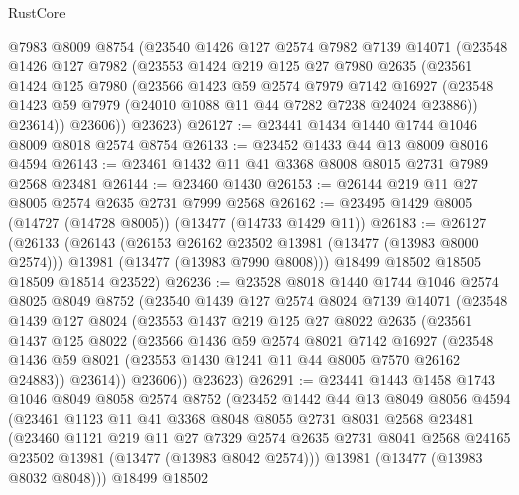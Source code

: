 \begin{lexlean}{RustCore}
\begin{coremodule}
    @7983
    @8009
    @8754
    (@23540
      @1426
      @127
      @2574
      @7982
      @7139
      @14071
      (@23548
        @1426
        @127
        @7982
        (@23553
          @1424
          @219
          @125
          @27
          @7980
          @2635
          (@23561
            @1424
            @125
            @7980
            (@23566
              @1423
              @59
              @2574
              @7979
              @7142
              @16927
              (@23548 @1423 @59 @7979 (@24010 @1088 @11 @44 @7282 @7238 @24024 @23886))
              @23614))
          @23606))
      @23623)
@26127 := @23441 @1434 @1440 @1744 @1046 @8009 @8018 @2574 @8754
@26133 := @23452 @1433 @44 @13 @8009 @8016 @4594
@26143 := @23461 @1432 @11 @41 @3368 @8008 @8015 @2731 @7989 @2568 @23481
@26144 := @23460 @1430
@26153 := @26144 @219 @11 @27 @8005 @2574 @2635 @2731 @7999 @2568
@26162 := @23495 @1429 @8005 (@14727 (@14728 @8005)) (@13477 (@14733 @1429 @11))
@26183 := @26127
    (@26133
      (@26143
        (@26153 @26162 @23502 @13981 (@13477 (@13983 @8000 @2574)))
        @13981
        (@13477 (@13983 @7990 @8008)))
      @18499
      @18502
      @18505
      @18509
      @18514
      @23522)
@26236 := @23528
    @8018
    @1440
    @1744
    @1046
    @2574
    @8025
    @8049
    @8752
    (@23540
      @1439
      @127
      @2574
      @8024
      @7139
      @14071
      (@23548
        @1439
        @127
        @8024
        (@23553
          @1437
          @219
          @125
          @27
          @8022
          @2635
          (@23561
            @1437
            @125
            @8022
            (@23566
              @1436
              @59
              @2574
              @8021
              @7142
              @16927
              (@23548 @1436 @59 @8021 (@23553 @1430 @1241 @11 @44 @8005 @7570 @26162 @24883))
              @23614))
          @23606))
      @23623)
@26291 := @23441
    @1443
    @1458
    @1743
    @1046
    @8049
    @8058
    @2574
    @8752
    (@23452
      @1442
      @44
      @13
      @8049
      @8056
      @4594
      (@23461
        @1123
        @11
        @41
        @3368
        @8048
        @8055
        @2731
        @8031
        @2568
        @23481
        (@23460
          @1121
          @219
          @11
          @27
          @7329
          @2574
          @2635
          @2731
          @8041
          @2568
          @24165
          @23502
          @13981
          (@13477 (@13983 @8042 @2574)))
        @13981
        (@13477 (@13983 @8032 @8048)))
      @18499
      @18502

\end{coremodule}
\end{lexlean}
